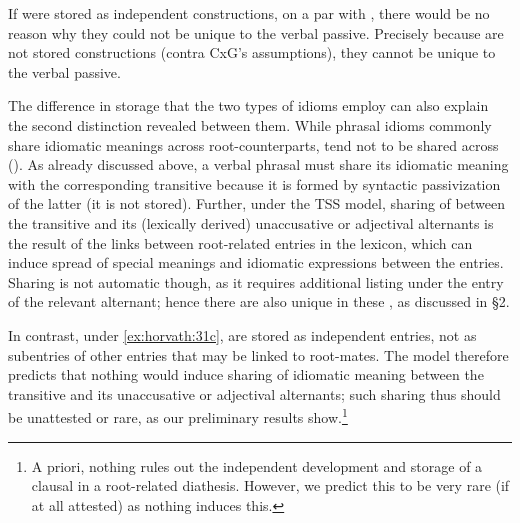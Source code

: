 \documentclass[output=paper,
modfonts
]{LSP/langsci}
\begin{document}
If  were stored as independent constructions, on a par
with , there would be no reason why they could not be
unique to the verbal passive. Precisely because  are not
stored constructions (contra CxG's assumptions), they cannot be unique
to the verbal passive.

The difference in storage that the two types of idioms employ can also
explain the second distinction revealed between them. While phrasal
idioms commonly share idiomatic meanings across root-counterparts,
 tend not to be shared across  (). As
already discussed above, a verbal  phrasal  must share its
idiomatic meaning with the corresponding transitive because it is formed
by syntactic passivization of the latter (it is not stored). Further,
under the TSS model, sharing of  between the transitive
and its (lexically derived) unaccusative or adjectival 
alternants is the result of the links between root-related entries in
the lexicon, which can induce spread of special meanings and idiomatic
expressions between the entries. Sharing is not automatic though, as it
requires additional listing under the entry of the relevant alternant;
hence there are also unique  in these , as
discussed in \S2.

In contrast, under \ref{ex:horvath:31c},  are stored as independent
entries, not as subentries of other entries that may be linked to
root-mates. The model therefore predicts that nothing would induce
sharing of idiomatic meaning between the transitive and its unaccusative
or adjectival  alternants; such sharing thus should be unattested
or rare, as our preliminary results show.\footnote{A priori, nothing
  rules out the independent development and storage of a clausal 
  in a root-related diathesis. However, we predict this to be very rare
  (if at all attested) as nothing induces this.}
\end{document}

